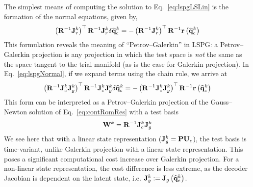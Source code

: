 The simplest means of computing the solution to Eq.~\ref{eq:lspgLSLin} is the formation of the normal equations, given by,
%
\begin{equation}\label{eq:lspgNormal}
    \left(\resScaleInv \jacobRes^{\newtonIdx}\right)^\top \resScaleInv \jacobRes^{\newtonIdx} \delta \consVecCoef^{\newtonIdx} = -\left(\resScaleInv \jacobRes^{\newtonIdx}\right)^\top \resScaleInv \resFunc{\consVecCoef^{\newtonIdx}}
\end{equation}
%
This formulation reveals the meaning of ``Petrov--Galerkin'' in LSPG: a Petrov--Galerkin projection is any projection in which the test space is \textit{not} the same as the space tangent to the trial manifold (as is the case for Galerkin projection). In Eq.~\ref{eq:lspgNormal}, if we expand terms using the chain rule, we arrive at
%
\begin{equation}
    \left(\resScaleInv \jacobCons^{\newtonIdx} \jacobDecode^{\newtonIdx}\right)^\top \resScaleInv \jacobCons^{\newtonIdx} \jacobDecode^{\newtonIdx} \delta \consVecCoef^{\newtonIdx} = -\left(\resScaleInv \jacobCons^{\newtonIdx} \jacobDecode^{\newtonIdx}\right)^\top \resScaleInv \resFunc{\consVecCoef^{\newtonIdx}}
\end{equation}
%
This form can be interpreted as a Petrov--Galerkin projection of the Gauss--Newton solution of Eq.~\ref{eq:contRomRes} with a test basis
%
\begin{equation}
    \testBasis^\newtonIdx = \resScaleInv \jacobCons^\newtonIdx \jacobDecode^{\newtonIdx}
\end{equation}
%
We see here that with a linear state representation ($\jacobDecode^{\newtonIdx} = \consScale \consTrial$), the test basis is time-variant, unlike Galerkin projection with a linear state representation. This poses a significant computational cost increase over Galerkin projection. For a non-linear state representation, the cost difference is less extreme, as the decoder Jacobian is dependent on the latent state, i.e. $\mathbf{J}_{g}^{k} := \mathbf{J}_{g} \left(\mathbf{\widehat{q}}_{c}^{k}\right)$.

